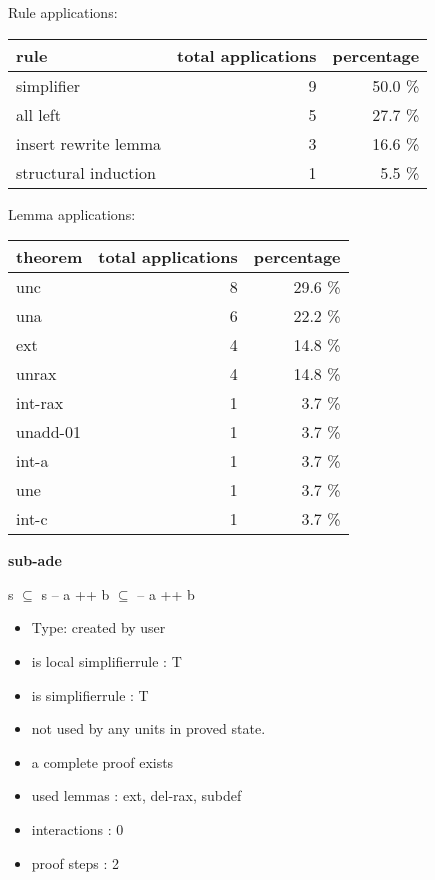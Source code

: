 \documentclass[a4paper]{article}
\begin{document}
Rule applications:

\begin{supertabular}{l|r|r}
rule	        & total applications & percentage \\ \hline
simplifier & 9 & 50.0 \% \\
all left & 5 & 27.7 \% \\
insert rewrite lemma & 3 & 16.6 \% \\
structural induction & 1 & 5.5 \% \\

\end{supertabular}

Lemma applications:

\begin{supertabular}{l|r|r}
theorem	        & total applications & percentage \\ \hline
unc & 8 & 29.6 \% \\
una & 6 & 22.2 \% \\
ext & 4 & 14.8 \% \\
unrax & 4 & 14.8 \% \\
int-rax & 1 & 3.7 \% \\
unadd-01 & 1 & 3.7 \% \\
int-a & 1 & 3.7 \% \\
une & 1 & 3.7 \% \\
int-c & 1 & 3.7 \% \\

\end{supertabular}
\pagebreak

{\LARGE\bf sub-ade}\label{lemma-sub-ade}

\medskip

 \Fol s $\subseteq$  \Imp s -- a ++ b $\subseteq$  -- a ++ b

\begin{itemize}

\item Type: created by user

\item is local simplifierrule : T
\item is simplifierrule : T
\item not used by any units in proved state.
\item       a complete proof exists
\item       used lemmas  : ext, del-rax, subdef
\item       interactions : 0
\item       proof steps  : 2
\end{itemize}
\end{document}

